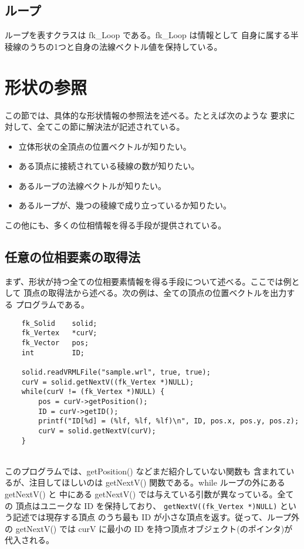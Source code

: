 \subsection{ループ}
ループを表すクラスは fk\_Loop である。fk\_Loop は情報として
自身に属する半稜線のうちの1つと自身の法線ベクトル値を保持している。

\section{形状の参照}
この節では、具体的な形状情報の参照法を述べる。たとえば次のような
要求に対して、全てこの節に解決法が記述されている。
\begin{itemize}
 \item 立体形状の全頂点の位置ベクトルが知りたい。
 \item ある頂点に接続されている稜線の数が知りたい。
 \item あるループの法線ベクトルが知りたい。
 \item あるループが、幾つの稜線で成り立っているか知りたい。
\end{itemize}
この他にも、多くの位相情報を得る手段が提供されている。

\subsection{任意の位相要素の取得法}
まず、形状が持つ全ての位相要素情報を得る手段について述べる。ここでは例として
頂点の取得法から述べる。次の例は、全ての頂点の位置ベクトルを出力する
プログラムである。
\\
\begin{breakbox}
\begin{verbatim}
    fk_Solid    solid;
    fk_Vertex   *curV;
    fk_Vector   pos;
    int         ID;

    solid.readVRMLFile("sample.wrl", true, true);
    curV = solid.getNextV((fk_Vertex *)NULL);
    while(curV != (fk_Vertex *)NULL) {
        pos = curV->getPosition();
        ID = curV->getID();
        printf("ID[%d] = (%lf, %lf, %lf)\n", ID, pos.x, pos.y, pos.z);
        curV = solid.getNextV(curV);
    }
\end{verbatim}
\end{breakbox}
~ \\
このプログラムでは、getPosition() などまだ紹介していない関数も
含まれているが、注目してほしいのは
getNextV() 関数である。while ループの外にある getNextV() と
中にある getNextV() では与えている引数が異なっている。全ての
頂点はユニークな ID を保持しており、
\verb+getNextV((fk_Vertex *)NULL)+ という記述では現存する頂点
のうち最も ID が小さな頂点を返す。従って、ループ外の getNextV() では
curV に最小の ID を持つ頂点オブジェクト(のポインタ)が代入される。

